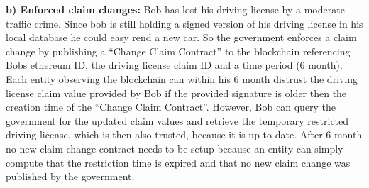\textbf{b) Enforced claim changes:}
Bob has lost his driving license by a moderate traffic crime. Since bob is still holding a signed version of his driving license in his local database he could easy rend a new car. So the government enforces a claim change by publishing a “Change Claim Contract” to the blockchain referencing Bobs ethereum ID, the driving license claim ID and a time period (6 month). Each entity observing the blockchain can within his 6 month distrust the driving license claim value provided by Bob if the provided signature is older then the creation time of the “Change Claim Contract”. However, Bob can query the government for the updated claim values and retrieve the temporary restricted driving license, which is then also trusted, because it is up to date. After 6 month no new claim change contract needs to be setup because an entity can simply compute that the restriction time is expired and that no new claim change was published by the government. 
